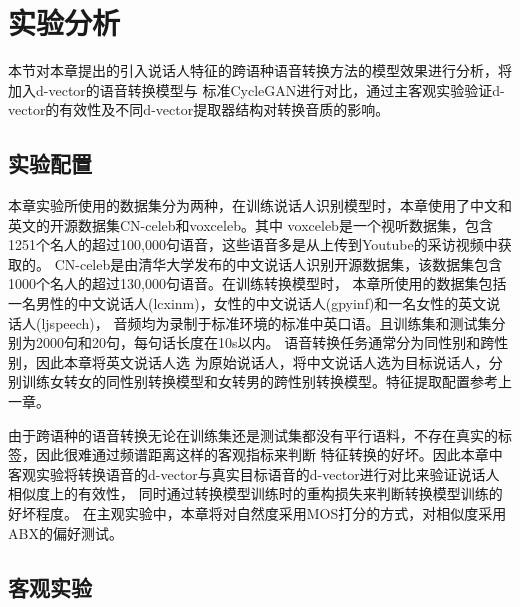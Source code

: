\section{实验分析}
本节对本章提出的引入说话人特征的跨语种语音转换方法的模型效果进行分析，将加入d-vector的语音转换模型与
标准CycleGAN进行对比，通过主客观实验验证d-vector的有效性及不同d-vector提取器结构对转换音质的影响。
\subsection{实验配置}
本章实验所使用的数据集分为两种，在训练说话人识别模型时，本章使用了中文和英文的开源数据集CN-celeb和voxceleb。其中
voxceleb是一个视听数据集，包含1251个名人的超过100,000句语音，这些语音多是从上传到Youtube的采访视频中获取的。
CN-celeb是由清华大学发布的中文说话人识别开源数据集，该数据集包含1000个名人的超过130,000句语音。在训练转换模型时，
本章所使用的数据集包括一名男性的中文说话人(lcxinm)，女性的中文说话人(gpyinf)和一名女性的英文说话人(ljspeech)，
音频均为录制于标准环境的标准中英口语。且训练集和测试集分别为2000句和20句，每句话长度在10s以内。
语音转换任务通常分为同性别和跨性别，因此本章将英文说话人选
为原始说话人，将中文说话人选为目标说话人，分别训练女转女的同性别转换模型和女转男的跨性别转换模型。特征提取配置参考上一章。



由于跨语种的语音转换无论在训练集还是测试集都没有平行语料，不存在真实的标签，因此很难通过频谱距离这样的客观指标来判断
特征转换的好坏。因此本章中客观实验将转换语音的d-vector与真实目标语音的d-vector进行对比来验证说话人相似度上的有效性，
同时通过转换模型训练时的重构损失来判断转换模型训练的好坏程度。
在主观实验中，本章将对自然度采用MOS打分的方式，对相似度采用ABX的偏好测试。

\subsection{客观实验}


